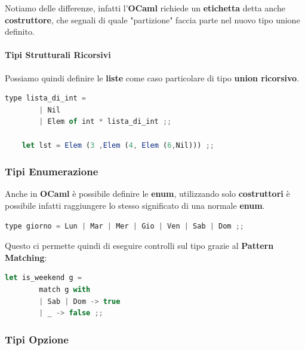 \documentclass{article}
\begin{document}
Notiamo delle differenze, infatti l'\textbf{OCaml} richiede un \textbf{etichetta} detta anche \textbf{costruttore}, che segnali di quale "partizione" faccia parte nel nuovo tipo unione definito.

\paragraph{Tipi Strutturali Ricorsivi} Possiamo quindi definire le \textbf{liste} come caso particolare di tipo \textbf{union ricorsivo}.

\vspace*{10px}
\begin{lstlisting}[language = JavaScript]
    type lista_di_int =
        | Nil
        | Elem of int * lista_di_int ;;
    
    let lst = Elem (3 ,Elem (4, Elem (6,Nil))) ;;
\end{lstlisting}
\vspace*{-20px}

\subsubsection{Tipi Enumerazione}

Anche in \textbf{OCaml} è possibile definire le \textbf{enum}, utilizzando solo \textbf{costruttori} è possibile infatti raggiungere lo stesso significato di una normale \textbf{enum}.

\vspace*{10px}
\begin{lstlisting}[language = JavaScript]
    type giorno = Lun | Mar | Mer | Gio | Ven | Sab | Dom ;;
\end{lstlisting}
\vspace*{-20px}

Questo ci permette quindi di eseguire controlli sul tipo grazie al \textbf{Pattern Matching}:

\vspace*{10px}
\begin{lstlisting}[language = JavaScript]
    let is_weekend g =
        match g with
        | Sab | Dom -> true
        | _ -> false ;;
\end{lstlisting}
\vspace*{-20px}

\subsubsection{Tipi Opzione}
\end{document}
